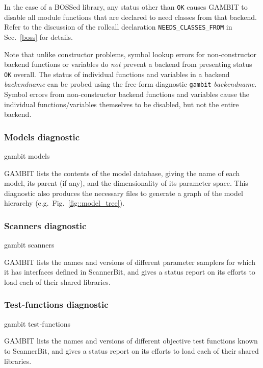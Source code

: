 \documentclass[pdftex,twocolumn,epjc3_preprint,runningheads]{svjour3}
\renewcommand{\_}{\discretionary{\underscore}{}{\underscore}}
\newcommand\cpp[1]{{\lstinline!#1!}}  %
\newcommand\term[1]{{\lstset{style=terminal}\lstinline!#1!\lstset{style=cpp}}}
\newcommand{\metavarf}[1]{\textit{\color{darkgreen}\footnotesize\textrm{#1}}}
\newcommand{\metavar}{\metavarf}
\newcommand{\gambit}{\textsf{GAMBIT}\xspace}
\newcommand{\scannerbit}{\textsf{ScannerBit}\xspace}
\newcommand{\GB}{\gambit}
\begin{document}
In the case of a BOSSed library, any status other than \texttt{\color{Green}OK} causes \GB to disable all module functions that are declared to need classes from that backend.  Refer to the discussion of the rollcall declaration \cpp{NEEDS_CLASSES_FROM} in Sec.\ \ref{boss} for details.

Note that unlike constructor problems, symbol lookup errors for non-constructor backend functions or variables do \emph{not} prevent a backend from presenting status \texttt{\color{Green}OK} overall.  The status of individual functions and variables in a backend \metavar{backend\_name} can be probed using the free-form diagnostic \term{gambit} \metavar{backend\_name}. Symbol errors from non-constructor backend functions and variables cause the individual functions/variables themselves to be disabled, but not the entire backend.

\subsubsection{Models diagnostic}
\label{models diagnostic}

\begin{lstterm}
gambit models
\end{lstterm}
\GB lists the contents of the model database, giving the name of each model, its parent (if any), and the dimensionality of its parameter space.  This diagnostic also produces the necessary files to generate a graph of the model hierarchy (e.g.\ Fig.\ \ref{fig::model_tree}).

\subsubsection{Scanners diagnostic}
\label{scanners diagnostic}

\begin{lstterm}
gambit scanners
\end{lstterm}
\GB lists the names and versions of different parameter samplers for which it has interfaces defined in \scannerbit, and gives a status report on its efforts to load each of their shared libraries.

\subsubsection{Test-functions diagnostic}
\label{test function diagnostic}

\begin{lstterm}
gambit test-functions
\end{lstterm}
\GB lists the names and versions of different objective test functions known to \scannerbit, and gives a status report on its efforts to load each of their shared libraries.
\end{document}
